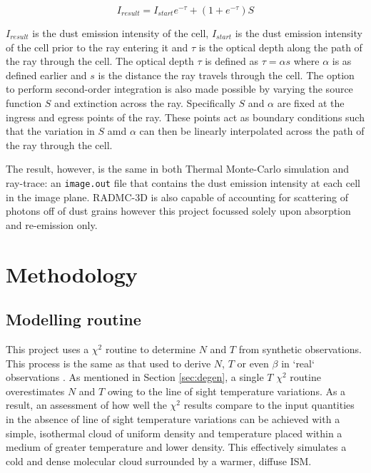 \documentclass{report}
\begin{document}
\begin{equation}
  I_{result} = I_{start}e^{-\tau}+(1+e^{-\tau})S
  \label{eq:raytrace}
\end{equation}

$I_{result}$ is the dust emission intensity of the cell, $I_{start}$ is the dust emission intensity of the cell prior to the ray entering it and $\tau$ is the optical depth along the path of the ray through the cell. The optical depth $\tau$ is defined as $\tau = \alpha s$ where $\alpha$ is as defined earlier and $s$ is the distance the ray travels through the cell. The option to perform second-order integration is also made possible by varying the source function $S$ and extinction across the ray. Specifically $S$ and $\alpha$ are fixed at the ingress and egress points of the ray. These points act as boundary conditions such that the variation in $S$ amd $\alpha$ can then be linearly interpolated across the path of the ray through the cell.

The result, however, is the same in both Thermal Monte-Carlo simulation and ray-trace: an \texttt{image.out} file that contains the dust emission intensity at each cell in the image plane. RADMC-3D is also capable of accounting for scattering of photons off of dust grains however this project focussed solely upon absorption and re-emission only.


\chapter{Methodology}
\section{Modelling routine}
This project uses a $\chi^{2}$ routine to determine $N$ and $T$ from synthetic observations. This process is the same as that used to derive $N$, $T$ or even $\beta$ in `real` observations \parencite{noise,noiseb}. As mentioned in Section \ref{sec:degen}, a single $T$ $\chi^{2}$ routine overestimates $N$ and $T$ owing to the line of sight temperature variations. As a result, an assessment of how well the $\chi^{2}$ results compare to the input quantities in the absence of line of sight temperature variations can be achieved with a simple, isothermal cloud of uniform density and temperature placed within a medium of greater temperature and lower density. This effectively simulates a cold and dense molecular cloud surrounded by a warmer, diffuse ISM.
\end{document}
